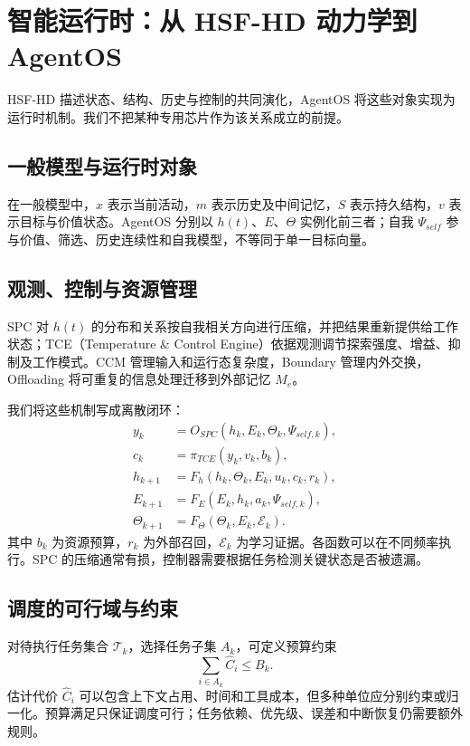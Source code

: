 \chapter{智能运行时：从 HSF-HD 动力学到 AgentOS}
\label{chap:software_control_msos}
\label{sec:section_2467}
\label{sec:section_9357}
\label{sec:micro_runtime_ode}
\label{sec:adiabatic_training_dynamics}
\label{sec:basal_metabolic_daemon}
\label{sec:section_2043}
\label{sec:section_6860}

HSF-HD 描述状态、结构、历史与控制的共同演化，AgentOS 将这些对象实现为运行时机制。我们不把某种专用芯片作为该关系成立的前提。
\section{一般模型与运行时对象}
在一般模型中，$x$ 表示当前活动，$m$ 表示历史及中间记忆，$S$ 表示持久结构，$v$ 表示目标与价值状态。AgentOS 分别以 $h(t)$、$E$、$\Theta$ 实例化前三者；自我 $\Psi_{self}$ 参与价值、筛选、历史连续性和自我模型，不等同于单一目标向量。
\section{观测、控制与资源管理}
SPC 对 $h(t)$ 的分布和关系按自我相关方向进行压缩，并把结果重新提供给工作状态；TCE（Temperature \& Control Engine）依据观测调节探索强度、增益、抑制及工作模式。CCM 管理输入和运行态复杂度，Boundary 管理内外交换，Offloading 将可重复的信息处理迁移到外部记忆 $M_e$。

我们将这些机制写成离散闭环：
\begin{align}
y_k&=O_{SPC}(h_k,E_k,\Theta_k,\Psi_{self,k}),\\
c_k&=\pi_{TCE}(y_k,v_k,b_k),\\
h_{k+1}&=F_h(h_k,\Theta_k,E_k,u_k,c_k,r_k),\\
E_{k+1}&=F_E(E_k,h_k,a_k,\Psi_{self,k}),\\
\Theta_{k+1}&=F_\Theta(\Theta_k,E_k,\mathcal E_k).
\end{align}
其中 $b_k$ 为资源预算，$r_k$ 为外部召回，$\mathcal E_k$ 为学习证据。各函数可以在不同频率执行。SPC 的压缩通常有损，控制器需要根据任务检测关键状态是否被遗漏。
\section{调度的可行域与约束}
对待执行任务集合 $\mathcal T_k$，选择任务子集 $A_k$，可定义预算约束
\begin{equation}\sum_{i\in A_k}\widehat C_i\le B_k.\end{equation}
估计代价 $\widehat C_i$ 可以包含上下文占用、时间和工具成本，但多种单位应分别约束或归一化。预算满足只保证调度可行；任务依赖、优先级、误差和中断恢复仍需要额外规则。
